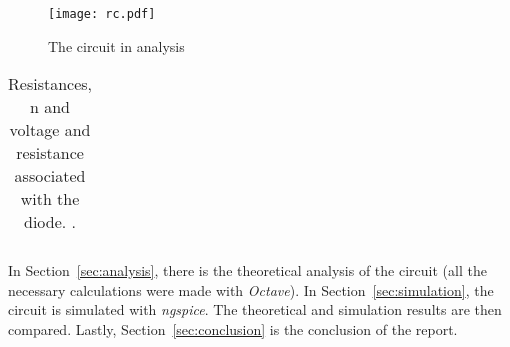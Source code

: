 \begin{figure}[H] \centering
\texttt{[image: rc.pdf]}
\caption{The circuit in analysis}
\label{fig:circuit}
\end{figure}

\begin{table}[H]
  \centering
  \begin{tabular}{|c|c|}
    \hline
      
  \end{tabular}
  \caption{Resistances, n and voltage and resistance associated with the diode. .}
  \label{tab:resistance}
\end{table}


In Section~\ref{sec:analysis}, there is the theoretical analysis of the circuit (all the necessary calculations were made with \textit{Octave}). In Section~\ref{sec:simulation}, the circuit is simulated with \textit{ngspice}. The theoretical and simulation results are then compared. Lastly,  Section~\ref{sec:conclusion} is the conclusion of the report. 
